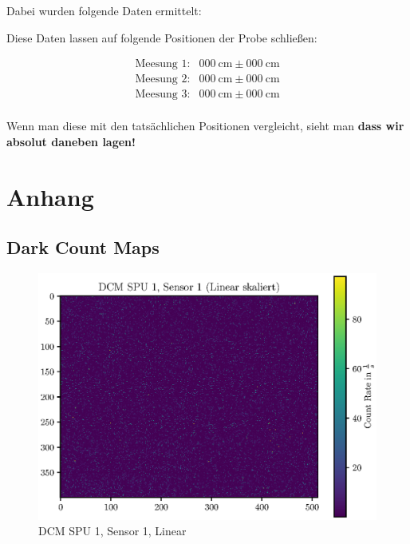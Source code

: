 \documentclass[12pt,twoside,a4paper]{scrartcl}
\begin{document}
				 Dabei wurden folgende Daten ermittelt:

				 

				 Diese Daten lassen auf folgende Positionen der Probe schließen:

				 \begin{align*}
				 	\text{Meesung 1:}& \SI{000}{\centi \metre} \pm \SI{000}{\centi \metre} \\
					\text{Meesung 2:}& \SI{000}{\centi \metre} \pm \SI{000}{\centi \metre} \\
					\text{Meesung 3:}& \SI{000}{\centi \metre} \pm \SI{000}{\centi \metre} \\
				 \end{align*}

				 Wenn man diese mit den tatsächlichen Positionen vergleicht, sieht man \textbf{dass wir absolut daneben lagen!}


	\newpage


	\section{}


	\section{Anhang}
		\label{Anhang}

		\subsection{Dark Count Maps}

		\begin{figure}[H]
			\includegraphics[width = \textwidth]{Plots/DCM/DCM_SPU1_Sensor1_lin.eps}
			\caption{DCM SPU 1, Sensor 1, Linear}
		\end{figure}
\end{document}
